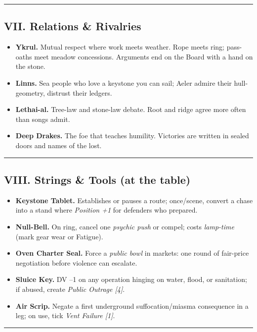 \documentclass[11pt]{article}
\begin{document}
\medskip\hrule\medskip

\subsection{VII. Relations \& Rivalries}

\begin{itemize}[leftmargin=*]
  \item \textbf{Ykrul.} Mutual respect where work meets weather. Rope meets ring; pass-oaths meet meadow concessions. Arguments end on the Board with a hand on the stone.
  \item \textbf{Linns.} Sea people who love a keystone you can sail; Aeler admire their hull-geometry, distrust their ledgers.
  \item \textbf{Lethai-al.} Tree-law and stone-law debate. Root and ridge agree more often than songs admit.
  \item \textbf{Deep Drakes.} The foe that teaches humility. Victories are written in sealed doors and names of the lost.
\end{itemize}

\medskip\hrule\medskip

\subsection{VIII. Strings \& Tools (at the table)}

\begin{itemize}[leftmargin=*]
  \item \textbf{Keystone Tablet.} Establishes or pauses a route; once/scene, convert a chase into a stand where \emph{Position +1} for defenders who prepared.
  \item \textbf{Null-Bell.} On ring, cancel one \emph{psychic push} or compel; costs \emph{lamp-time} (mark gear wear or Fatigue).
  \item \textbf{Oven Charter Seal.} Force a \emph{public bowl} in markets: one round of fair-price negotiation before violence can escalate.
  \item \textbf{Sluice Key.} DV --1 on any operation hinging on water, flood, or sanitation; if abused, create \emph{Public Outrage [4]}.
  \item \textbf{Air Scrip.} Negate a first underground suffocation/miasma consequence in a leg; on use, tick \emph{Vent Failure [1]}.
\end{itemize}

\medskip\hrule\medskip
\end{document}
